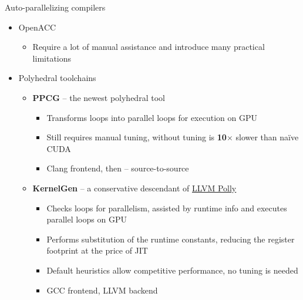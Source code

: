 \documentclass[aspectratio=169]{beamer}
\begin{document}
\begin{frame}[fragile]{Auto-parallelizing compilers}

\begin{itemize}
\item OpenACC
    \begin{itemize}
    \item Require a lot of manual assistance and introduce many practical limitations
    \end{itemize}
\item Polyhedral toolchains
    \begin{itemize}
    \item \textbf{PPCG} -- the newest polyhedral tool
        \begin{itemize}
        \item Transforms loops into parallel loops for execution on GPU
        \item Still requires manual tuning, without tuning is \textbf{10$\times$} slower than na\"{i}ve CUDA
        \item Clang frontend, then -- source-to-source
        \end{itemize}
    \item \textbf{KernelGen} -- a conservative descendant of \href{http://polly.llvm.org}{LLVM Polly}
        \begin{itemize}
        \item Checks loops for parallelism, assisted by runtime info and executes parallel loops on GPU
        \item Performs substitution of the runtime constants, reducing the register footprint at the price of JIT
        \item Default heuristics allow competitive performance, no tuning is needed
        \item GCC frontend, LLVM backend
        \end{itemize}
    \end{itemize}
\end{itemize}

\end{frame}
\end{document}
